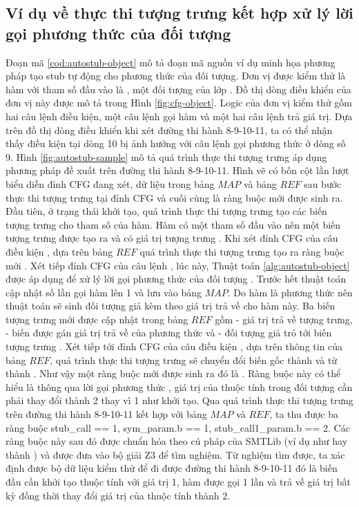 \subsection{Ví dụ về thực thi tượng trưng kết hợp xử lý lời gọi phương thức của đối tượng}
Đoạn mã \ref{cod:autostub-object} mô tả đoạn mã nguồn ví dụ minh họa phương pháp tạo stub tự động cho phương thức của đối tượng. Đơn vị được kiểm thử là hàm  với tham số đầu vào là , một đối tượng của lớp . Đồ thị dòng điều khiển của đơn vị này được mô tả trong Hình \ref{fig:cfg-object}. Logic của đơn vị kiểm thử gồm hai câu lệnh điều kiện, một câu lệnh gọi hàm và một hai câu lệnh trả giá trị. Dựa trên đồ thị dòng điều khiển khi xét đường thi hành 8-9-10-11, ta có thể nhận thấy điều kiện  tại dòng 10 bị ảnh hưởng với câu lệnh gọi phương thức ở dòng số 9. Hình \ref{fig:autostub-sample} mô tả quá trình thực thi tượng trưng áp dụng phương pháp đề xuất trên đường thi hành 8-9-10-11. Hình vẽ có bốn cột lần lượt biểu diễn đỉnh CFG đang xét, dữ liệu trong bảng $MAP$ và bảng $REF$ sau bước thực thi tượng trưng tại đỉnh CFG và cuối cùng là ràng buộc mới được sinh ra. Đầu tiên, ở trạng thái khởi tạo, quá trình thực thi tượng trưng tạo các biến tượng trưng cho tham số của hàm. Hàm  có một tham số đầu vào nên một biến tượng trưng  được tạo ra và có giá trị tượng trưng . Khi xét đỉnh CFG của câu điều kiện , dựa trên bảng $REF$ quá trình thực thi tượng trưng tạo ra ràng buộc mới . Xét tiếp đỉnh CFG của câu lệnh , lúc này, Thuật toán \ref{alg:autostub-object} được áp dụng để xử lý lời gọi phương thức của đối tượng . Trước hết thuật toán cập nhật số lần gọi hàm  lên 1 và lưu vào bảng $MAP$. Do hàm  là phương thức nên thuật toán sẽ sinh đối tượng giả kèm theo giá trị trả về cho hàm này. Ba biến tượng trưng mới được cập nhật trong bảng $REF$ gồm  - giá trị trả về tượng trưng,  - biến được gán giá trị trả về của phương thức và  - đối tượng giả trỏ tới biến tượng trưng . Xét tiếp tới đỉnh CFG của câu điều kiện , dựa trên thông tin của bảng $REF$, quá trình thực thi tượng trưng sẽ chuyển đổi biến  gốc thành  và từ  thành . Như vậy một ràng buộc mới được sinh ra đó là . Ràng buộc này có thể hiểu là thông qua lời gọi phương thức , giá trị của thuộc tính  trong đối tượng  cần phải thay đổi thành 2 thay vì 1 như khởi tạo. Qua quá trình thực thi tượng trưng trên đường thi hành 8-9-10-11 kết hợp với bảng $MAP$ và $REF$, ta thu được ba ràng buộc {stub\_call == 1, sym\_param.b == 1, stub\_call1\_param.b == 2}. Các ràng buộc này sau đó được chuẩn hóa theo cú pháp của SMTLib (ví dụ như hay  thành ) và được đưa vào bộ giải Z3 để tìm nghiệm. Từ nghiệm tìm được, ta xác định được bộ dữ liệu kiểm thử để đi được đường thi hành 8-9-10-11 đó là biến  đầu cần khởi tạo thuộc tính  với giá trị 1, hàm  được gọi 1 lần và trả về giá trị bất kỳ đồng thời thay đổi giá trị của thuộc tính  thành 2. 
